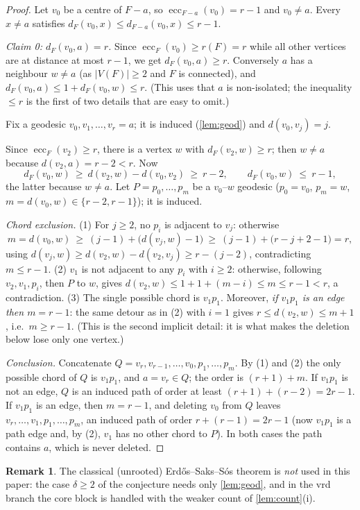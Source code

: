 \documentclass[11pt]{article}
\theoremstyle{definition}
\newtheorem{remark}[theorem]{Remark}
\newcommand{\ecc}{\operatorname{ecc}}
\begin{document}
\begin{proof}
Let $v_0$ be a centre of $F-a$, so $\ecc_{F-a}(v_0)=r-1$ and $v_0\ne a$.
Every $x\ne a$ satisfies $d_F(v_0,x)\le d_{F-a}(v_0,x)\le r-1$.

\emph{Claim 0: $d_F(v_0,a)=r$.}
Since $\ecc_F(v_0)\ge r(F)=r$ while all other vertices are at distance at
most $r-1$, we get $d_F(v_0,a)\ge r$.  Conversely $a$ has a neighbour
$w\ne a$ (as $|V(F)|\ge2$ and $F$ is connected), and
$d_F(v_0,a)\le1+d_F(v_0,w)\le r$.  (This uses that $a$ is non-isolated; the
inequality $\le r$ is the first of two details that are easy to omit.)

Fix a geodesic $v_0,v_1,\dots,v_r=a$; it is induced
(\cref{lem:geod}) and $d(v_0,v_j)=j$.

Since $\ecc_F(v_2)\ge r$, there is a vertex $w$ with $d_F(v_2,w)\ge r$; then
$w\ne a$ because $d(v_2,a)=r-2<r$.  Now
\[
 d_F(v_0,w)\ \ge\ d(v_2,w)-d(v_0,v_2)\ \ge\ r-2,\qquad
 d_F(v_0,w)\ \le\ r-1 ,
\]
the latter because $w\ne a$.  Let $P=p_0,\dots,p_m$ be a $v_0$--$w$ geodesic
($p_0=v_0$, $p_m=w$, $m=d(v_0,w)\in\{r-2,r-1\}$); it is induced.

\emph{Chord exclusion.}
(1) For $j\ge2$, no $p_i$ is adjacent to $v_j$: otherwise
\[
 m=d(v_0,w)\ \ge\ (j-1)+\bigl(d(v_j,w)-1\bigr)\ \ge\ (j-1)+\bigl(r-j+2-1\bigr)=r,
\]
using $d(v_j,w)\ge d(v_2,w)-d(v_2,v_j)\ge r-(j-2)$, contradicting $m\le r-1$.
(2) $v_1$ is not adjacent to any $p_i$ with $i\ge2$: otherwise, following
$v_2,v_1,p_i$, then $P$ to $w$, gives
$d(v_2,w)\le 1+1+(m-i)\le m\le r-1<r$, a contradiction.
(3) The single possible chord is $v_1p_1$.
Moreover, \emph{if $v_1p_1$ is an edge then $m=r-1$}: the same detour as in
(2) with $i=1$ gives $r\le d(v_2,w)\le m+1$, i.e.\ $m\ge r-1$.  (This is the
second implicit detail: it is what makes the deletion below lose only one
vertex.)

\emph{Conclusion.}  Concatenate
$Q=v_r,v_{r-1},\dots,v_0,p_1,\dots,p_m$.  By (1) and (2) the only possible
chord of $Q$ is $v_1p_1$, and $a=v_r\in Q$; the order is $(r+1)+m$.
If $v_1p_1$ is not an edge, $Q$ is an induced path of order at least
$(r+1)+(r-2)=2r-1$.  If $v_1p_1$ is an edge, then $m=r-1$, and deleting
$v_0$ from $Q$ leaves $v_r,\dots,v_1,p_1,\dots,p_m$, an induced path of
order $r+(r-1)=2r-1$ (now $v_1p_1$ is a path edge and, by (2), $v_1$ has no
other chord to $P$).  In both cases the path contains $a$, which is never
deleted.
\end{proof}

\begin{remark}
The classical (unrooted) Erd\H{o}s--Saks--S\'os theorem
\cite{ESS1986,ChungCredit} is \emph{not} used in this paper: the case
$\delta\ge2$ of the conjecture needs only \cref{lem:geod}, and in the
vrd branch the core block is handled with the weaker count of
\cref{lem:count}(i).
\end{remark}
\end{document}
